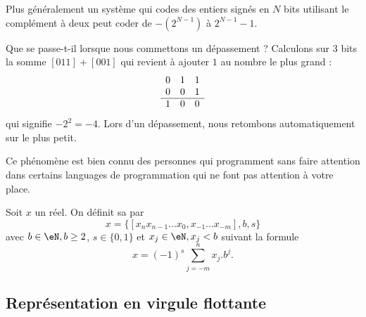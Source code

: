 Plus généralement un système qui codes des entiers signés en \( N\) bits utilisant le complément à deux peut coder de \( -(2^{N-1})\) à \( 2^{N-1}-1\).

\begin{normaltext}[Le dépassement]
	Que se passe-t-il lorsque nous commettons un dépassement ? Calculons sur \( 3\) bits la somme \( [011]+[001]\) qui revient à ajouter \( 1\) au nombre le plus grand :
	\begin{equation*}
		\begin{array}[]{ccc}
			0 & 1 & 1 \\
			0 & 0 & 1 \\
			\hline
			1 & 0 & 0 \\
		\end{array}
	\end{equation*}
	qui signifie \( -2^2=-4\). Lors d'un dépassement, nous retombons automatiquement sur le plus petit.

	Ce phénomène est bien connu des personnes qui programment sans faire attention dans certains languages de programmation qui ne font pas attention à votre place.
\end{normaltext}


\begin{definition}
	Soit \( x\) un réel. On définit sa  par
	\begin{equation}
		x=\{[x_nx_{n-1}...x_0,x_{-1}...x_{-m}], b, s\}
	\end{equation}
	avec  \( b\in\eN, b\geq2\), \( s\in\{0,1\}\) et \( x_j\in\eN,x_j<b\) suivant la formule
	\begin{equation}
		x=(-1)^{s}\sum_{j=-m}^nx_j.b^j.
	\end{equation}
\end{definition}

\subsection{Représentation en virgule flottante}


